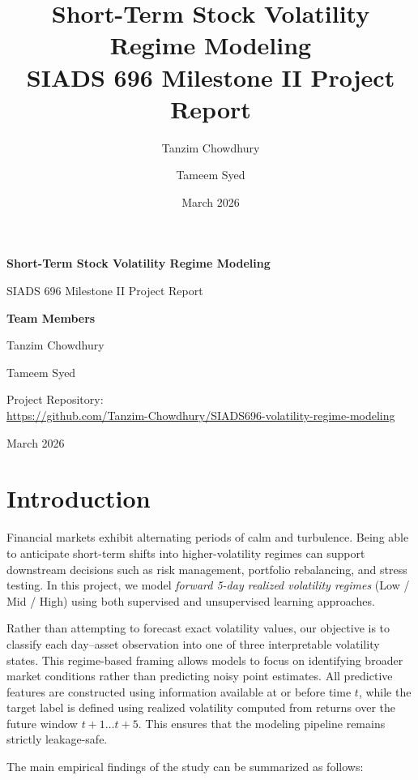 \documentclass[11pt]{article}
\title{\textbf{Short-Term Stock Volatility Regime Modeling}\\
\vspace{0.15em}\large SIADS 696 Milestone II Project Report}
\author{Tanzim Chowdhury \and Tameem Syed}
\date{\vspace{-1.0em}March 2026}
\begin{document}
\begin{titlepage}
    \centering
    \vspace*{1.2in}
    {\LARGE \textbf{Short-Term Stock Volatility Regime Modeling}\par}
    \vspace{0.35in}
    {\Large SIADS 696 Milestone II Project Report\par}
    \vspace{0.55in}
    {\large \textbf{Team Members}\par}
    \vspace{0.15in}
    {\large Tanzim Chowdhury\par}
    {\large Tameem Syed\par}

\vspace{0.6in}

{\small
Project Repository:\\
\url{https://github.com/Tanzim-Chowdhury/SIADS696-volatility-regime-modeling}
}

\vfill
{\large March 2026\par}
\end{titlepage}

\section{Introduction}
Financial markets exhibit alternating periods of calm and turbulence. Being able to anticipate short-term shifts into higher-volatility regimes can support downstream decisions such as risk management, portfolio rebalancing, and stress testing. In this project, we model \textit{forward 5-day realized volatility regimes} (Low / Mid / High) using both supervised and unsupervised learning approaches.

Rather than attempting to forecast exact volatility values, our objective is to classify each day--asset observation into one of three interpretable volatility states. This regime-based framing allows models to focus on identifying broader market conditions rather than predicting noisy point estimates. All predictive features are constructed using information available at or before time $t$, while the target label is defined using realized volatility computed from returns over the future window $t+1 \dots t+5$. This ensures that the modeling pipeline remains strictly leakage-safe.

The main empirical findings of the study can be summarized as follows:
\end{document}

